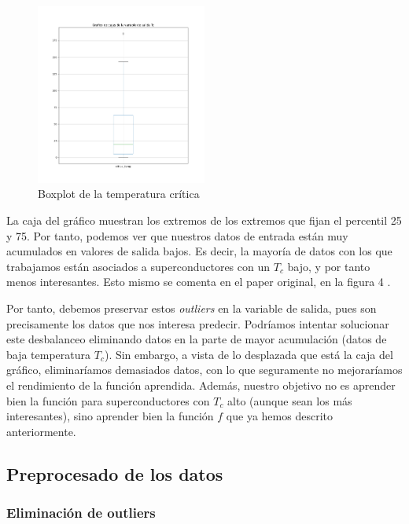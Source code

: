 \documentclass[11pt]{article}
\begin{document}
\begin{figure}[H]
    \centering
    \includegraphics[width=0.5\textwidth]{output_var_boxplot}
    \caption{Boxplot de la temperatura crítica}
\end{figure}

La caja del gráfico muestran los extremos de los extremos que fijan el percentil 25 y 75. Por tanto, podemos ver que nuestros datos de entrada están muy acumulados en valores de salida bajos. Es decir, la mayoría de datos con los que trabajamos están asociados a superconductores con un $T_c$ bajo, y por tanto menos interesantes. Esto mismo se comenta en el paper original, en la figura 4 \cite{original_paper_reg:paper}.

Por tanto, debemos preservar estos \emph{outliers} en la variable de salida, pues son precisamente los datos que nos interesa predecir. Podríamos intentar solucionar este desbalanceo eliminando datos en la parte de mayor acumulación (datos de baja temperatura $T_c$). Sin embargo, a vista de lo desplazada que está la caja del gráfico, eliminaríamos demasiados datos, con lo que seguramente no mejoraríamos el rendimiento de la función aprendida. Además, nuestro objetivo no es aprender bien la función para superconductores con $T_c$ alto (aunque sean los más interesantes), sino aprender bien la función $f$ que ya hemos descrito anteriormente.

\pagebreak
\subsection{Preprocesado de los datos}

\subsubsection{Eliminación de outliers}
\end{document}

